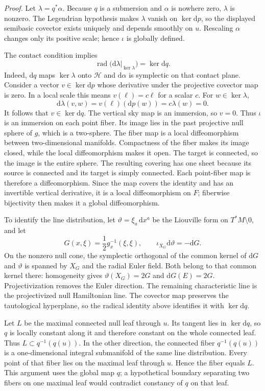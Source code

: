 \documentclass[
  english,
  11pt,
  reqno]{amsart}
\begin{document}
\emph{Proof.} Let \(\lambda=q^*\alpha\). Because \(q\) is a submersion
and \(\alpha\) is nowhere zero, \(\lambda\) is nonzero. The Legendrian
hypothesis makes \(\lambda\) vanish on \(\ker\mathrm dp\), so the
displayed semibasic covector exists uniquely and depends smoothly on
\(u\). Rescaling \(\alpha\) changes only its positive scale; hence
\(\iota\) is globally defined.

The contact condition implies \[
\operatorname{rad}\bigl(\mathrm d\lambda|_{\ker\lambda}\bigr)
=\ker\mathrm dq.
\] Indeed, \(\mathrm dq\) maps \(\ker\lambda\) onto \(\mathcal H\) and
\(\mathrm d\alpha\) is symplectic on that contact plane. Consider a
vector \(v\in\ker\mathrm dp\) whose derivative under the projective
covector map is zero. In a local scale this means \(v(\ell)=c\ell\) for
a scalar \(c\). For \(w\in\ker\lambda\), \[
\mathrm d\lambda(v,w)=v(\ell)(\mathrm dp(w))=c\lambda(w)=0.
\] It follows that \(v\in\ker\mathrm dq\). The vertical sky map is an
immersion, so \(v=0\). Thus \(\iota\) is an immersion on each point
fiber. Its image lies in the past projective null sphere of \(g\), which
is a two-sphere. The fiber map is a local diffeomorphism between
two-dimensional manifolds. Compactness of the fiber makes its image
closed, while the local diffeomorphism makes it open. The target is
connected, so the image is the entire sphere. The resulting covering has
one sheet because its source is connected and its target is simply
connected. Each point-fiber map is therefore a diffeomorphism. Since the
map covers the identity and has an invertible vertical derivative, it is
a local diffeomorphism on \(F\); fiberwise bijectivity then makes it a
global diffeomorphism.

To identify the line distribution, let \(\vartheta=\xi_a\,\mathrm dx^a\)
be the Liouville form on \(T^*M\setminus0\), and let \[
G(x,\xi)=\frac12g_x^{-1}(\xi,\xi),
\qquad
\iota_{X_G}\mathrm d\vartheta=-\mathrm dG.
\] On the nonzero null cone, the symplectic orthogonal of the common
kernel of \(\mathrm dG\) and \(\vartheta\) is spanned by \(X_G\) and the
radial Euler field. Both belong to that common kernel there: homogeneity
gives \(\vartheta(X_G)=2G\) and \(\mathrm dG(E)=2G\). Projectivization
removes the Euler direction. The remaining characteristic line is the
projectivized null Hamiltonian line. The covector map preserves the
tautological hyperplane, so the radical identity above identifies it
with \(\ker\mathrm dq\).

Let \(L\) be the maximal connected null leaf through \(u\). Its tangent
lies in \(\ker\mathrm dq\), so \(q\) is locally constant along it and
therefore constant on the whole connected leaf. Thus
\(L\subset q^{-1}(q(u))\). In the other direction, the connected fiber
\(q^{-1}(q(u))\) is a one-dimensional integral submanifold of the same
line distribution. Every point of that fiber lies on the maximal leaf
through \(u\). Hence the fiber equals \(L\). This argument uses the
global map \(q\); a hypothetical boundary separating two fibers on one
maximal leaf would contradict constancy of \(q\) on that leaf.
\end{document}
